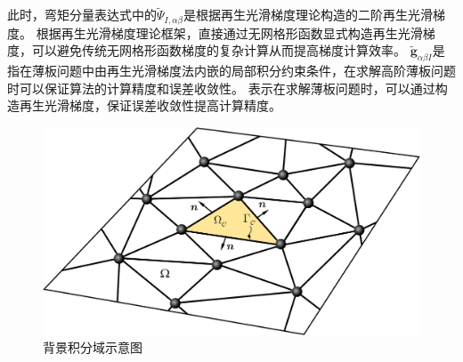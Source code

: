 此时，弯矩分量表达式中的$\tilde{\Psi}_{I,\alpha\beta}$是根据再生光滑梯度理论\cite{}构造的二阶再生光滑梯度。
根据再生光滑梯度理论框架，直接通过无网格形函数显式构造再生光滑梯度，可以避免传统无网格形函数梯度的复杂计算从而提高梯度计算效率。
$\tilde{\pmb g}_{\alpha\beta I}$是指在薄板问题中由再生光滑梯度法内嵌的局部积分约束条件，在求解高阶薄板问题时可以保证算法的计算精度和误差收敛性。
表示在求解薄板问题时，可以通过构造再生光滑梯度，保证误差收敛性提高计算精度。
\begin{figure}[H]
    \centering
    \includegraphics[scale=0.5]{figure/PHR/momentlisan.png}
    \caption{背景积分域示意图}\label{Pintegralscheme}
\end{figure}
